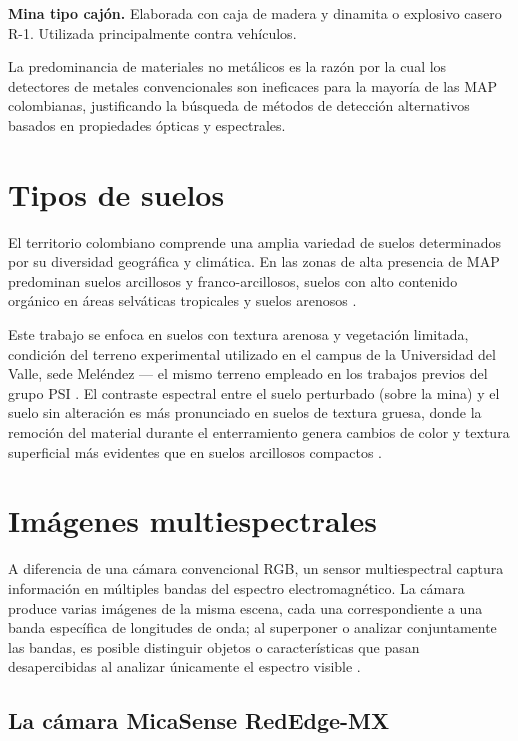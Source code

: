 \textbf{Mina tipo cajón.} Elaborada con caja de madera y dinamita o
explosivo casero R-1. Utilizada principalmente contra vehículos.

La predominancia de materiales no metálicos es la razón por la cual los
detectores de metales convencionales son ineficaces para la mayoría de las
\ac{MAP} colombianas, justificando la búsqueda de métodos de detección
alternativos basados en propiedades ópticas y espectrales.

\section{Tipos de suelos}

El territorio colombiano comprende una amplia variedad de suelos determinados
por su diversidad geográfica y climática. En las zonas de alta presencia de
\ac{MAP} predominan suelos arcillosos y franco-arcillosos, suelos con alto
contenido orgánico en áreas selváticas tropicales y suelos arenosos
\cite{IsaacAnteproyecto}.

Este trabajo se enfoca en suelos con textura arenosa y vegetación limitada,
condición del terreno experimental utilizado en el campus de la Universidad
del Valle, sede Meléndez --- el mismo terreno empleado en los trabajos previos
del grupo \ac{PSI} \cite{forero2022,tenorio2024}. El contraste espectral
entre el suelo perturbado (sobre la mina) y el suelo sin alteración es más
pronunciado en suelos de textura gruesa, donde la remoción del material
durante el enterramiento genera cambios de color y textura superficial más
evidentes que en suelos arcillosos compactos \cite{nanni2006}.

\section{Imágenes multiespectrales}

A diferencia de una cámara convencional RGB, un sensor multiespectral
captura información en múltiples bandas del espectro electromagnético.
La cámara produce varias imágenes de la misma escena, cada una
correspondiente a una banda específica de longitudes de onda; al
superponer o analizar conjuntamente las bandas, es posible distinguir
objetos o características que pasan desapercibidas al analizar únicamente el espectro visible
\cite{navarro2024}.

\subsection{La cámara MicaSense RedEdge-MX}

